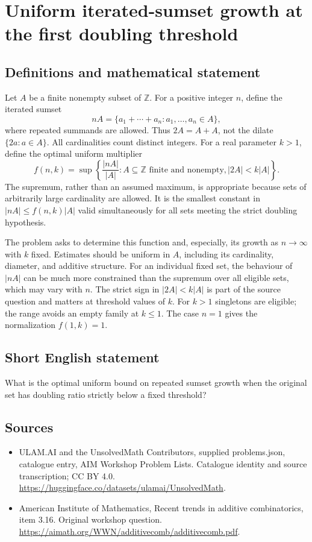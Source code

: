 \documentclass[11pt,a4paper]{article}
\begin{document}
\section*{Uniform iterated-sumset growth at the first doubling threshold}\label{statement}

\subsection{Definitions and mathematical statement}
Let $A$ be a finite nonempty subset of $\mathbb Z$. For a positive
integer $n$, define the iterated sumset
\[
                 nA=\{a_1+\cdots+a_n:a_1,\ldots,a_n\in A\},
\]
where repeated summands are allowed. Thus $2A=A+A$, not the dilate
$\{2a:a\in A\}$. All cardinalities count distinct integers.
For a real parameter $k>1$, define the optimal uniform multiplier
\[
 f(n,k)=\sup\left\{\frac{|nA|}{|A|}:
       A\subseteq\mathbb Z\text{ finite and nonempty},
                                      |2A|<k|A|\right\}.
\]
The supremum, rather than an assumed maximum, is appropriate because
sets of arbitrarily large cardinality are allowed. It is the smallest
constant in $|nA|\le f(n,k)|A|$ valid simultaneously for all sets
meeting the strict doubling hypothesis.

The problem asks to determine this function and, especially, its
growth as $n\to\infty$ with $k$ fixed. Estimates should be uniform
in $A$, including its cardinality, diameter, and additive structure.
For an individual fixed set, the behaviour of $|nA|$ can be much
more constrained than the supremum over all eligible sets, which
may vary with $n$. The strict sign in $|2A|<k|A|$ is part of the
source question and matters at threshold values of $k$. For $k>1$
singletons are eligible; the range avoids an empty family at
$k\le1$. The case $n=1$ gives the normalization $f(1,k)=1$.
\subsection{Short English statement}
What is the optimal uniform bound on repeated sumset growth when the original set has doubling ratio strictly below a fixed threshold?
\subsection{Sources}
\begin{itemize}
\item[S1] ULAM.AI and the UnsolvedMath Contributors, supplied problems.json, catalogue entry, AIM Workshop Problem Lists. Catalogue identity and source transcription; CC BY 4.0.
\url{https://huggingface.co/datasets/ulamai/UnsolvedMath}.
\item[S2] American Institute of Mathematics, Recent trends in additive combinatorics, item 3.16. Original workshop question.
\url{https://aimath.org/WWN/additivecomb/additivecomb.pdf}.
\end{itemize}
\end{document}
